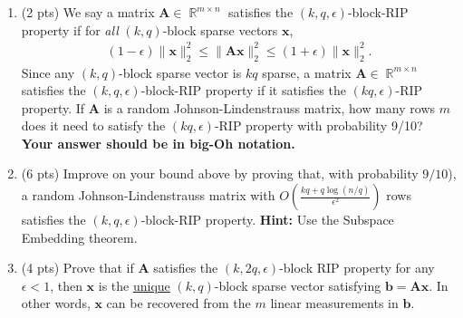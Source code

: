 \documentclass[10pt]{article}
\newcommand{\bs}[1]{\boldsymbol{#1}}
\newcommand{\bv}[1]{\mathbf{#1}}
\DeclareMathOperator{\R}{\mathbb{R}}
\begin{document}
\begin{enumerate}[label=(\alph*)]		
	\item (2 pts) We say a matrix $\bv{A}\in \R^{m\times n}$ satisfies the $(k,q,\epsilon)$-block-RIP property if for \emph{all} $(k,q)$-block sparse vectors $\bv{x}$, \vspace{-1em}
	\begin{align*}
		(1-\epsilon)\|\bv{x}\|_2^2 \leq \|\bv{A}\bv{x}\|_2^2 \leq (1+\epsilon)\|\bv{x}\|_2^2.
	\end{align*} 
Since any $(k,q)$-block sparse vector is $kq$ sparse, a matrix $\bv{A}\in \R^{m\times n}$ satisfies the $(k,q,\epsilon)$-block-RIP property if it satisfies the $(kq,\epsilon)$-RIP property. If $\bv{A}$ is a random Johnson-Lindenstrauss  matrix, how many rows $m$ does it need to satisfy the $(kq,\epsilon)$-RIP property with probability 9/10? \textbf{Your answer should be in big-Oh notation.} \vspace{5em}
	
	\item (6 pts) Improve on your bound above by proving that, with probability $9/10$), a random Johnson-Lindenstrauss matrix with $O\left(\frac{kq + q\log(n/q)}{\epsilon^2}\right)$ rows satisfies the $(k,q,\epsilon)$-block-RIP property. \textbf{Hint:} Use the Subspace Embedding theorem.
	\vspace{21em}

	
	\item (4 pts)
Prove that if $\bv{A}$ satisfies the  $(k,2q,\epsilon)$-block RIP property for any $\epsilon <1$, then $\bv{x}$ is the \ul{unique} $(k,q)$-block sparse vector satisfying 	$\bv{b} = \bv{A}\bv{x}$. In other words, $\bv{x}$ can be recovered from the $m$ linear measurements in $\bv{b}$.
	\vspace{10em}
\end{enumerate}

\end{document}
